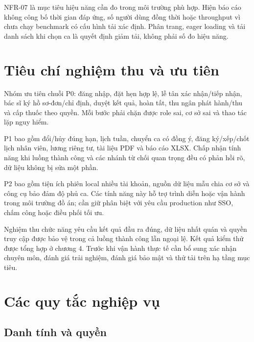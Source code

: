 NFR-07 là mục tiêu hiệu năng cần đo trong môi trường phù hợp.\allowbreak{} Hiện báo cáo không công bố thời gian đáp ứng, số người dùng đồng thời hoặc throughput vì chưa chạy benchmark có cấu hình tải xác định.\allowbreak{} Phân trang, eager loading và tải danh sách khi chọn ca là quyết định giảm tải, không phải số đo hiệu năng.\allowbreak{}


\section{Tiêu chí nghiệm thu và ưu tiên}
Nhóm ưu tiên chuỗi P0:\allowbreak{} đăng nhập, đặt hẹn hợp lệ, lễ tân xác nhận/\allowbreak{}tiếp nhận, bác sĩ ký hồ sơ-đơn/\allowbreak{}chỉ định, duyệt kết quả, hoàn tất, thu ngân phát hành/\allowbreak{}thu và cấp thuốc theo quyền.\allowbreak{} Mỗi bước phải chặn được role sai, cơ sở sai và thao tác lặp nguy hiểm.\allowbreak{}

P1 bao gồm đổi/\allowbreak{}hủy đúng hạn, lịch tuần, chuyển ca có đồng ý, đăng ký/\allowbreak{}xếp/\allowbreak{}chốt lịch nhân viên, lương riêng tư, tài liệu PDF và báo cáo XLSX.\allowbreak{} Chấp nhận tính năng khi luồng thành công và các nhánh từ chối quan trọng đều có phản hồi rõ, dữ liệu không bị sửa một phần.\allowbreak{}

P2 bao gồm tiện ích phiên local nhiều tài khoản, nguồn dữ liệu mẫu chia cơ sở và công cụ bảo đảm độ phủ ca.\allowbreak{} Các tính năng này hỗ trợ trình diễn hoặc vận hành trong môi trường đồ án; cần giữ phân biệt với yêu cầu production như SSO, chấm công hoặc điều phối tối ưu.\allowbreak{}

Nghiệm thu chức năng yêu cầu kết quả đầu ra đúng, dữ liệu nhất quán và quyền truy cập được bảo vệ trong cả luồng thành công lẫn ngoại lệ.\allowbreak{} Kết quả kiểm thử được tổng hợp ở chương 4.\allowbreak{} Trước khi vận hành thực tế cần bổ sung xác nhận chuyên môn, đánh giá trải nghiệm, đánh giá bảo mật và thử tải trên hạ tầng mục tiêu.\allowbreak{}


\section{Các quy tắc nghiệp vụ}

\subsection{Danh tính và quyền}

